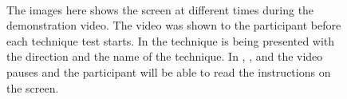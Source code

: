 \begin{figure}[H]
\\
\caption{The images here shows the screen at different times during the demonstration video. The video was shown to the participant before each technique test starts. In \protect{} the technique is being presented with the direction and the name of the technique. In \protect{}, \protect{}, and \protect{} the video pauses and the participant will be able to read the instructions on the screen.}
\label{fig:demovideo}
\end{figure}